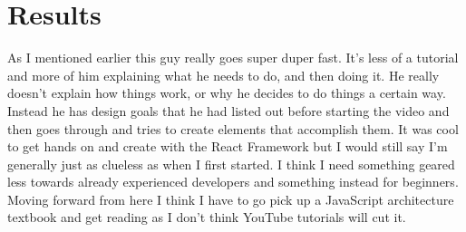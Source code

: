 \documentclass[10pt,twocolumn]{article}
\begin{document}
\section{Results}

As I mentioned earlier this guy really goes super duper fast. It’s less of a tutorial and more of him explaining what he needs to do, and then doing it. He really doesn't explain how things work, or why he decides to do things a certain way. Instead he has design goals that he had listed out before starting the video and then goes through and tries to create elements that accomplish them. It was cool to get hands on and create with the React Framework but I would still say I’m generally just as clueless as when I first started. I think I need something geared less towards already experienced developers and something instead for beginners. Moving forward from here I think I have to go pick up a JavaScript architecture textbook and get reading as I don’t think YouTube tutorials will cut it.

\printbibliography
 
\end{document}
